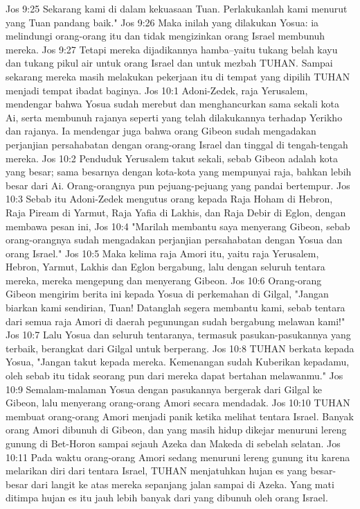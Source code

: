 Jos 9:25  Sekarang kami di dalam kekuasaan Tuan. Perlakukanlah kami menurut yang Tuan pandang baik."
Jos 9:26  Maka inilah yang dilakukan Yosua: ia melindungi orang-orang itu dan tidak mengizinkan orang Israel membunuh mereka.
Jos 9:27  Tetapi mereka dijadikannya hamba--yaitu tukang belah kayu dan tukang pikul air untuk orang Israel dan untuk mezbah TUHAN. Sampai sekarang mereka masih melakukan pekerjaan itu di tempat yang dipilih TUHAN menjadi tempat ibadat baginya.
Jos 10:1  Adoni-Zedek, raja Yerusalem, mendengar bahwa Yosua sudah merebut dan menghancurkan sama sekali kota Ai, serta membunuh rajanya seperti yang telah dilakukannya terhadap Yerikho dan rajanya. Ia mendengar juga bahwa orang Gibeon sudah mengadakan perjanjian persahabatan dengan orang-orang Israel dan tinggal di tengah-tengah mereka.
Jos 10:2  Penduduk Yerusalem takut sekali, sebab Gibeon adalah kota yang besar; sama besarnya dengan kota-kota yang mempunyai raja, bahkan lebih besar dari Ai. Orang-orangnya pun pejuang-pejuang yang pandai bertempur.
Jos 10:3  Sebab itu Adoni-Zedek mengutus orang kepada Raja Hoham di Hebron, Raja Piream di Yarmut, Raja Yafia di Lakhis, dan Raja Debir di Eglon, dengan membawa pesan ini,
Jos 10:4  "Marilah membantu saya menyerang Gibeon, sebab orang-orangnya sudah mengadakan perjanjian persahabatan dengan Yosua dan orang Israel."
Jos 10:5  Maka kelima raja Amori itu, yaitu raja Yerusalem, Hebron, Yarmut, Lakhis dan Eglon bergabung, lalu dengan seluruh tentara mereka, mereka mengepung dan menyerang Gibeon.
Jos 10:6  Orang-orang Gibeon mengirim berita ini kepada Yosua di perkemahan di Gilgal, "Jangan biarkan kami sendirian, Tuan! Datanglah segera membantu kami, sebab tentara dari semua raja Amori di daerah pegunungan sudah bergabung melawan kami!"
Jos 10:7  Lalu Yosua dan seluruh tentaranya, termasuk pasukan-pasukannya yang terbaik, berangkat dari Gilgal untuk berperang.
Jos 10:8  TUHAN berkata kepada Yosua, "Jangan takut kepada mereka. Kemenangan sudah Kuberikan kepadamu, oleh sebab itu tidak seorang pun dari mereka dapat bertahan melawanmu."
Jos 10:9  Semalam-malaman Yosua dengan pasukannya bergerak dari Gilgal ke Gibeon, lalu menyerang orang-orang Amori secara mendadak.
Jos 10:10  TUHAN membuat orang-orang Amori menjadi panik ketika melihat tentara Israel. Banyak orang Amori dibunuh di Gibeon, dan yang masih hidup dikejar menuruni lereng gunung di Bet-Horon sampai sejauh Azeka dan Makeda di sebelah selatan.
Jos 10:11  Pada waktu orang-orang Amori sedang menuruni lereng gunung itu karena melarikan diri dari tentara Israel, TUHAN menjatuhkan hujan es yang besar-besar dari langit ke atas mereka sepanjang jalan sampai di Azeka. Yang mati ditimpa hujan es itu jauh lebih banyak dari yang dibunuh oleh orang Israel.
